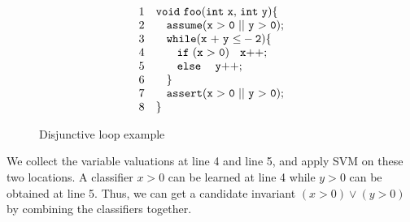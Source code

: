 \begin{figure}%
    \raggedright
    \vspace{-0.2cm} \[
      \begin{array}{ll}
      1 & \code{void~foo(int ~x{,} ~int~y)\{} \\
      2 & \code{~~~ assume(x~{>}~0~ {||} ~y~{>}~0);}  \\
      3 & \code{~~~ while(x~{+}~y~{\le}-2)\{}  \\
      4 & \code{~~~ \quad if~(x~{>}~0) ~~~x{++};}  \\
      5 & \code{~~~ \quad else~ ~~~y{++};}\\
      6 & \code{~~~\}} \\
      7 & \code{~~~assert(x~{>}~0~ {||} ~y~{>}~0);}\\
      8 & \}
      \end{array}
    \]
\caption{Disjunctive loop example}
\label{fig:disjunctive:example}
\end{figure}
\vspace{-0.2cm}
We collect the variable valuations at line 4 and line 5, and apply SVM on these two locations. 
A classifier $x>0$ can be learned at line 4 while $y>0$ can be obtained at line 5.
Thus, we can get a candidate invariant $(x>0) \vee (y>0)$ by combining the classifiers together.


